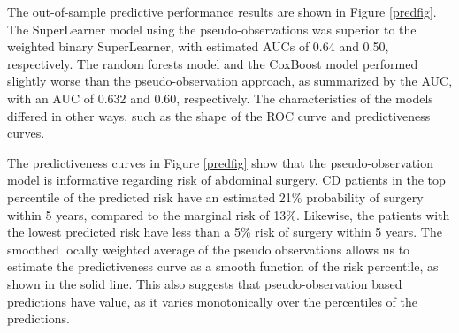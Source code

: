\documentclass{statsoc}
\begin{document}
The out-of-sample predictive performance results are shown in Figure \ref{predfig}. The SuperLearner model using the pseudo-observations was superior to the weighted binary SuperLearner, with estimated AUCs of 0.64 and 0.50, respectively. The random forests model and the CoxBoost model performed slightly worse than the pseudo-observation approach, as summarized by the AUC, with an AUC of 0.632 and 0.60, respectively. The characteristics of the models differed in other ways, such as the shape of the ROC curve and predictiveness curves. 

The predictiveness curves in Figure \ref{predfig} show that the pseudo-observation model is informative regarding risk of abdominal surgery. CD patients in the top percentile of the predicted risk have an estimated 21\% probability of surgery within 5 years, compared to the marginal risk of 13\%. Likewise, the patients with the lowest predicted risk have less than a 5\% risk of surgery within 5 years. The smoothed locally weighted average of the pseudo observations allows us to estimate the predictiveness curve as a smooth function of the risk percentile, as shown in the solid line. This also suggests that pseudo-observation based predictions have value, as it varies monotonically over the percentiles of the predictions. 
\end{document}
